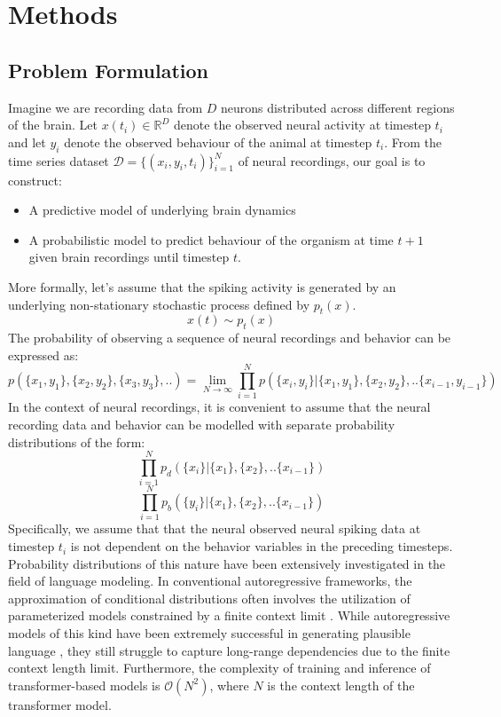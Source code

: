 \chapter{Methods}
\section{Problem Formulation}

Imagine we are recording data from $D$ neurons distributed across different regions of the brain. Let $x(t_i) \in \mathbb{R}^D$ denote the observed neural activity at timestep $t_i$ and let $y_i$ denote the observed behaviour of the animal at timestep $t_i$. From the time series dataset $\mathcal{D} = \{(x_i,y_i,t_i) \}_{i=1}^N$ of neural recordings, our goal is to
construct:
\begin{itemize}
    \item A predictive model of underlying brain dynamics
    \item A probabilistic model to predict behaviour of the organism at time $t+1$ given brain recordings until timestep $t$.
\end{itemize}
More formally, let's assume that the spiking activity is generated by an underlying non-stationary stochastic process defined by $p_t(x)$. 
\begin{equation}
    x(t) \sim p_t(x)
\end{equation}
The probability of observing a sequence of neural recordings and behavior can be expressed as:
\begin{equation}
    p( \{x_1,y_1\},\{x_2,y_2\},\{x_3,y_3\},..) = 
    \lim_{N \to \infty} \prod_{i=1}^{N} p(\{x_{i},y_{i}\}| \{x_1,y_1\},\{x_2,y_2\},..\{x_{i-1},y_{i-1}\})
\end{equation}
In the context of neural recordings, it is convenient to assume that the neural recording data and behavior can be modelled with separate probability distributions of the form:
\begin{equation}
   \prod_{i=1}^{N} p_d(\{x_{i}\}| \{x_1\},\{x_2\},..\{x_{i-1}\})
\end{equation}
\begin{equation}
   \prod_{i=1}^{N} p_b(\{y_{i}\}| \{x_1\},\{x_2\},..\{x_{i-1}\})
\end{equation}
Specifically, we assume that that the neural observed neural spiking data at timestep $t_i$ is not dependent on the behavior variables in the preceding timesteps. Probability distributions of this nature have been extensively investigated in the field of language modeling. In conventional autoregressive frameworks, the approximation of conditional distributions often involves the utilization of parameterized models constrained by a finite context limit \cite{vaswani2017attention}. While autoregressive models of this kind have been extremely successful in generating plausible language \cite{radford2018improving}, they still struggle to capture long-range dependencies due to the finite context length limit\cite{hahn2020theoretical}. Furthermore, the complexity of training and inference of transformer-based models is $\mathcal{O}(N^2)$, where $N$ is the context length of the transformer model.\\




